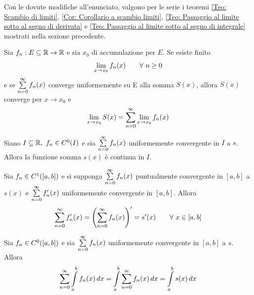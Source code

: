 Con le dovute modifiche all'enunciato, valgono per le serie i teoremi \ref{Teo: Scambio di limiti}, \ref{Cor: Corollario a scambio limiti}, \ref{Teo: Passaggio al limite sotto al segno di derivata} e \ref{Teo: Passaggio al limite sotto al segno di integrale} mostrati nella sezione precedente.
\begin{theorem}
    Sia $f_n: E \subseteq \mathbb{R} \to \mathbb{R}$ e sia $x_0$ di accumulazione per $E$. Se esiste finito
    \begin{equation}
        \lim_{x \to x_0}{f_n(x)} \qquad \forall\ n\geq0
    \end{equation}
    e se $\sum\limits_{n=0}^{\infty}{f_n(x)}$ converge uniformemente su E alla somma $S(x)$, allora $S(x)$ converge per $x \to x_0$ e 
    \begin{equation}
        \lim_{x \to x_0}{S(x)= \sum\limits_{n=0}^{\infty}{\lim_{x \to x_0}{f_n(x)}}}
    \end{equation}
\end{theorem}
\begin{theorem}
    Siano $I \subseteq \mathbb{R},\ f_n \in C^0(I)$ e sia $\sum\limits_{n=0}^{\infty}{f_n(x)}$ uniformemente convergente in $I$ a $s$. Allora la funzione somma $s(x)$ è continua in $I$.
\end{theorem}
\begin{theorem}
    Sia $f_n \in C^1([a,b])$ e si supponga $\sum\limits_{n=0}^{\infty}{f_n(x)}$ puntualmente convergente in $[a,b]$ a $s(x)$ e $\sum\limits_{n=0}^{\infty}{f_n'(x)}$ uniformemente convergente in $[a,b]$. Allora
    \begin{equation}
        \sum\limits_{n=0}^{\infty}{f_n'(x)}= 
        \left(\sum\limits_{n=0}^{\infty}{f_n(x)}\right)'= s'(x) \qquad \forall\ x \in [a,b]
    \end{equation}
\end{theorem}
\begin{theorem}
    Sia $f_n \in C^0([a,b])$ e sia $\sum\limits_{n=0}^{\infty}{f_n(x)}$ uniformemente convergente in $[a,b]$ a $s$. Allora
    \begin{equation}
        \sum\limits_{n=0}^{\infty}{\int\limits_{a}^{b}{f_n(x)}\, dx}= \int\limits_{a}^{b}{\sum\limits_{n=0}^{\infty}{f_n(x)}\, dx}= \int\limits_{a}^{b}{s(x)}\, dx
    \end{equation}
\end{theorem}
